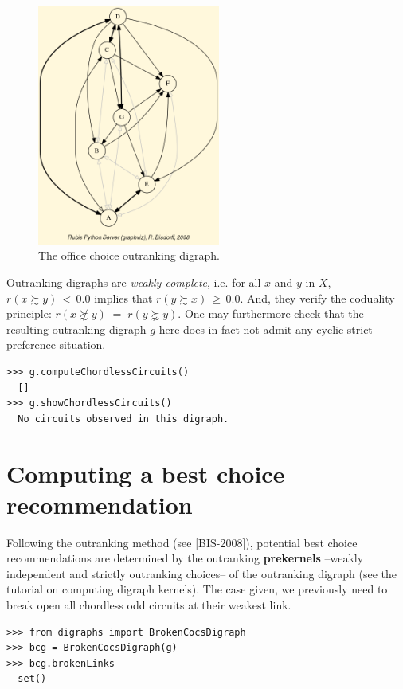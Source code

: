 \begin{figure}[h]
\sidecaption
\includegraphics[width=6cm]{Figures/officeChoice.png}
\caption{The office choice outranking digraph.}
\label{fig:6.3}       %
\end{figure}

Outranking digraphs are \emph{weakly complete}, i.e. for all $x$ and $y$ in $X$, $r(x \succsim y)\, <\, 0.0$ implies that $r(y \succsim x)\, \geq\, 0.0$. And, they verify the coduality principle:  $r(x \not\succsim y) \;=\; r(y \succnsim y)$. One may furthermore check that the resulting outranking digraph $g$ here does in fact not admit any cyclic strict preference situation.

\begin{lstlisting}
>>> g.computeChordlessCircuits()
  []
>>> g.showChordlessCircuits()
  No circuits observed in this digraph.
\end{lstlisting}

\section{Computing a \Rubis best choice recommendation}
\label{sec:6.3}

Following the \Rubis outranking method (see [BIS-2008]), potential best choice recommendations are determined by the outranking \textbf{prekernels} --weakly independent and strictly outranking choices-- of the outranking digraph (see the tutorial on computing digraph kernels). The case given, we previously need to break open all chordless odd circuits at their weakest link.

\begin{lstlisting}
>>> from digraphs import BrokenCocsDigraph
>>> bcg = BrokenCocsDigraph(g)
>>> bcg.brokenLinks
  set()
\end{lstlisting}

